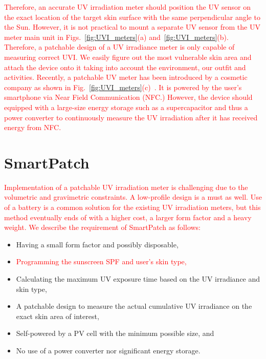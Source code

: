 \documentclass[journal]{IEEEtran}
\begin{document}
\textcolor{red}{Therefore, an accurate UV irradiation meter should position the UV sensor on the exact location of the target skin surface with the same perpendicular angle to the Sun. However, it is not practical to mount a separate UV sensor from the \textcolor{red}{UV meter main unit in Figs.~\ref{fig:UVI_meters}(a) and~\ref{fig:UVI_meters}(b)}. Therefore, a patchable design of a UV irradiance meter is only capable of measuring correct UVI. We easily figure out the most vulnerable skin area and attach the device onto it taking into account the environment, our outfit and activities. Recently, a patchable UV meter has been introduced by a cosmetic company as shown in Fig.~\ref{fig:UVI_meters}(c)~\cite{LOreal}. It is powered by the user's smartphone via Near Field Communication (NFC.) However, the device should equipped with a large-size energy storage such as a supercapacitor and thus a power converter to continuously measure the UV irradiation after it has received energy from NFC.}

\section{SmartPatch}

\textcolor{red}{Implementation of a patchable UV irradiation meter is challenging due to the volumetric and gravimetric constraints. A low-profile design is a must as well. Use of a battery is a common solution for the existing UV irradiation meters, but this method eventually ends of with a higher cost, a larger form factor and a heavy weight. We describe the requirement of SmartPatch as follows:}

\begin{itemize}
\item Having a small form factor and possibly disposable,
\item \textcolor{red}{Programming the sunscreen SPF and user's skin type,}
\item Calculating the maximum UV exposure time based on the UV irradiance and skin type,
\item A patchable design to measure the actual cumulative UV irradiance on the exact skin area of interest,
\item Self-powered by a PV cell with the minimum possible size, and
\item No use of a power converter nor significant energy storage.
\end{itemize}
\end{document}
